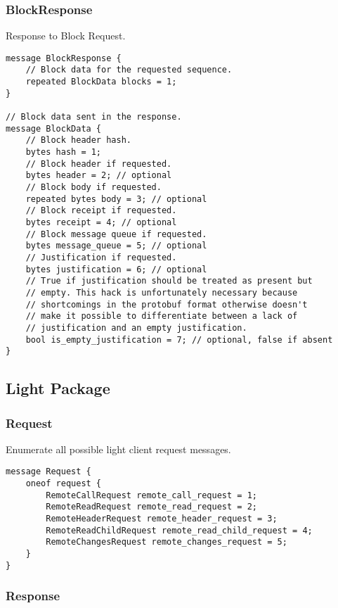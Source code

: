 \documentclass{book}
\begin{document}
\subsubsection{BlockResponse}

Response to Block Request.

\begin{lstlisting}[frame=single]
message BlockResponse {
    // Block data for the requested sequence.
    repeated BlockData blocks = 1;
} 

// Block data sent in the response.
message BlockData {
    // Block header hash.
    bytes hash = 1;
    // Block header if requested.
    bytes header = 2; // optional
    // Block body if requested.
    repeated bytes body = 3; // optional
    // Block receipt if requested.
    bytes receipt = 4; // optional
    // Block message queue if requested.
    bytes message_queue = 5; // optional
    // Justification if requested.
    bytes justification = 6; // optional
    // True if justification should be treated as present but
    // empty. This hack is unfortunately necessary because 
    // shortcomings in the protobuf format otherwise doesn't
    // make it possible to differentiate between a lack of 
    // justification and an empty justification.
    bool is_empty_justification = 7; // optional, false if absent
}
\end{lstlisting}

\subsection{Light Package}

\subsubsection{Request}

Enumerate all possible light client request messages.

\begin{lstlisting}[frame=single]
message Request {
	oneof request {
		RemoteCallRequest remote_call_request = 1;
		RemoteReadRequest remote_read_request = 2;
		RemoteHeaderRequest remote_header_request = 3;
		RemoteReadChildRequest remote_read_child_request = 4;
		RemoteChangesRequest remote_changes_request = 5;
	}
}
\end{lstlisting}

\subsubsection{Response}
\end{document}
